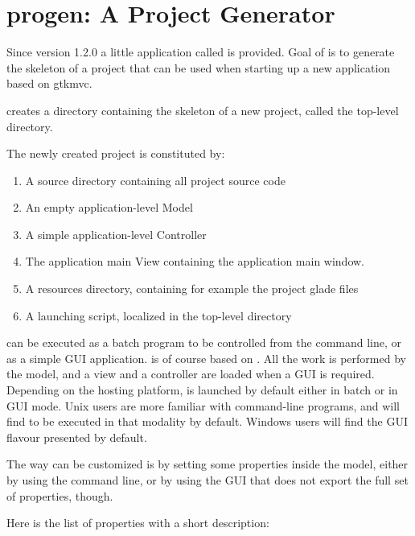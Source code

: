 \section{progen: A Project Generator}

Since version 1.2.0 a little application called 
is provided. Goal of  is to generate the skeleton
of a project that can be used when starting up a new application
based on gtkmvc.

 creates a directory containing the skeleton of a
new project, called the top-level directory.

The newly created project is constituted by:
\begin{enumerate}
\item A source directory containing all project source code
\item An empty application-level Model
\item A simple application-level Controller
\item The application main View containing the application main window. 
\item A resources directory, containing for example the project
  glade files
\item A launching script, localized in the top-level directory
\end{enumerate}


 can be executed as a batch program to be
controlled from the command line, or as a simple GUI
application.  is of course based on \pygtkmvc. All
the work is performed by the model, and a view and a controller are
loaded when a GUI is required. Depending on the hosting platform,
 is launched by default either in batch or in GUI
mode. Unix users are more familiar with command-line programs, and
will find  to be executed in that modality by
default. Windows users will find the GUI flavour presented by
default.

The way  can be customized is by setting some
properties inside the model, either by using the command line, or by
using the GUI that does not export the full set of properties,
though.

Here is the list of properties with a short description:

